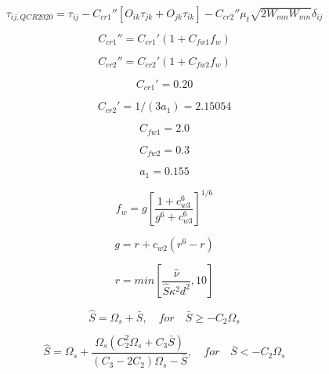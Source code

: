 

\begin{equation}
\tau_{ij,QCR2020} = \tau_{ij} - C_{cr1}'' \left[ O_{ik} \tau_{jk} + O_{jk} \tau_{ik} \right]
- C_{cr2}'' \mu_t \sqrt{2 W_{mn}W_{mn}}\delta_{ij}
\end{equation}

\begin{equation}
C_{cr1}'' = C_{cr1}'(1 + C_{fw1} f_w)
\end{equation}

\begin{equation}
C_{cr2}'' = C_{cr2}'(1 + C_{fw2} f_w)
\end{equation}

\begin{equation}
C_{cr1}'=0.20
\end{equation}

\begin{equation}
C_{cr2}'=1/(3 a_1)=2.15054
\end{equation}

\begin{equation}
C_{fw1}=2.0
\end{equation}

\begin{equation}
C_{fw2}=0.3
\end{equation}

\begin{equation}
a_1 = 0.155
\end{equation}

\begin{equation}
f_w = g \left[ \frac{1 + c_{w3}^6}{g^6 + c_{w3}^6} \right]^{1/6}
\end{equation}

\begin{equation}
g = r + c_{w2}(r^6 - r)
\end{equation}

\begin{equation}
r = min \left[ \frac{\hat \nu}{\hat S \kappa^2 d^2}, 10 \right]
\end{equation}

\begin{equation}
\hat S = \Omega_s + \bar S, \quad for \quad \bar S \geq -C_2 \Omega_s
\end{equation}

\begin{equation}
\hat S = \Omega_s + \frac{\Omega_s(C_2^2\Omega_s + C_3 \bar S)}{(C_3-2C_2)\Omega_s - \bar S}, \quad for \quad \bar S < -C_2 \Omega_s
\end{equation}

